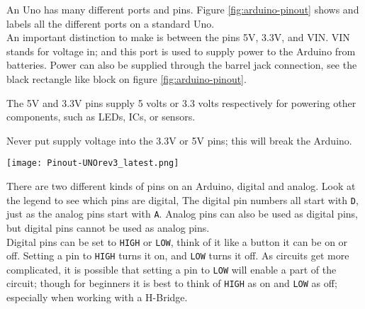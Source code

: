 \documentclass[../TinyBot.tex]{subfiles}
\begin{document}
An Uno has many different ports and pins. Figure \ref{fig:arduino-pinout} shows and labels all the different ports on a standard Uno. \\

An important distinction to make is between the pins 5V, 3.3V, and VIN. VIN stands for voltage in; and this port is used to supply power to the Arduino from batteries. Power can also be supplied through the barrel jack connection, see the black rectangle like block on figure \ref{fig:arduino-pinout}. 

The 5V and 3.3V  pins supply 5 volts or 3.3 volts respectively for powering other components, such as LEDs, ICs, or sensors.  \\

\begin{warningbox}
    Never put supply voltage into the 3.3V or 5V pins; this will break the Arduino. 
\end{warningbox}


\begin{center}
    \texttt{[image: Pinout-UNOrev3\_latest.png]}
    \label{fig:arduino-pinout}
\end{center}


There are two different kinds of pins on an Arduino, digital and analog. Look at the legend to see which pins are digital, The digital pin numbers all start with \lstinline[]!D!, just as the analog pins start with \lstinline[]!A!.
Analog pins can also be used as digital pins, but digital pins cannot be used as analog pins. \\


Digital pins can be set to \lstinline[]!HIGH! or \lstinline[]!LOW!, think of it like a button it can be on or off. Setting a pin to \lstinline[]!HIGH! turns it on, and \lstinline[]!LOW! turns it off. As circuits get more complicated, it is possible that setting a pin to \lstinline[]!LOW! will enable a part of the circuit; though for beginners it is best to think of \lstinline[]!HIGH! as on and \lstinline[]!LOW! as off; especially when working with a H-Bridge. 

\end{document}
